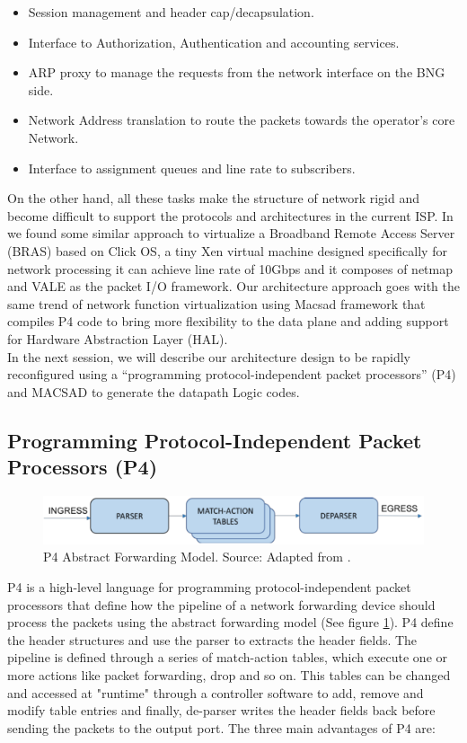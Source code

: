 \begin{itemize}
\item Session management and header cap/decapsulation.
\item Interface to Authorization, Authentication and accounting services.
\item ARP proxy to manage the requests from the network interface on the BNG side.
\item Network Address translation to route the packets towards the operator’s core Network.
\item Interface to assignment queues and line rate to subscribers.
\end{itemize}
On the other hand, all these tasks make the structure of network rigid and become difficult to support the protocols and architectures in the current ISP.  In \cite{Rethinking} we found some similar approach to virtualize a Broadband Remote Access Server (BRAS) based on Click OS, a tiny Xen virtual machine designed specifically for network processing it can achieve line rate of 10Gbps and it composes of netmap and VALE as the packet I/O framework.
Our architecture approach goes with the same trend of network function virtualization using Macsad framework that compiles P4 code to bring more flexibility to the data plane and adding support for Hardware Abstraction Layer (HAL).\\
In the next session, we will describe our architecture design to be rapidly reconfigured using a “programming protocol-independent packet processors” (P4) and MACSAD to generate the datapath Logic codes.


\subsection{Programming Protocol-Independent Packet Processors (P4)}
\begin{figure}[!h]
	\centering
	\includegraphics[width=0.7\linewidth]{figures/p4_dp.png}
	\caption{P4 Abstract Forwarding Model. Source: Adapted from \cite{P4}.}
	\label{fig:p4_dp}
\end{figure}
P4 is a high-level language for programming protocol-independent packet processors that define how the pipeline of a network forwarding device should process the packets using the abstract forwarding model (See figure \ref{fig:p4_dp}). P4 define the header structures and use the parser to extracts the header fields. The pipeline is defined through a series of match-action tables, which execute one or more actions like packet forwarding, drop and so on.  This tables can be changed and accessed at "runtime" through a controller software to add, remove and modify table entries and finally, de-parser writes the header fields back before sending the packets to the output port. The three main advantages of P4 are:

